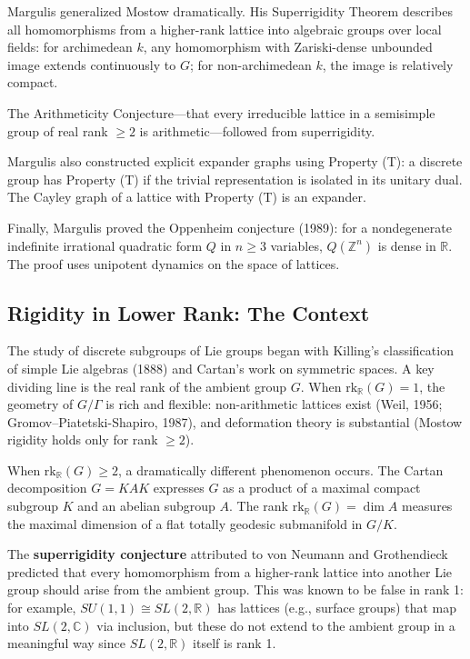 Margulis generalized Mostow dramatically. His Superrigidity Theorem
describes all homomorphisms from a higher-rank lattice into algebraic
groups over local fields: for archimedean $k$, any homomorphism with
Zariski-dense unbounded image extends continuously to $G$; for
non-archimedean $k$, the image is relatively compact.

The Arithmeticity Conjecture---that every irreducible lattice in a
semisimple group of real rank $\ge 2$ is arithmetic---followed from
superrigidity.

Margulis also constructed explicit expander graphs using Property (T):
a discrete group has Property (T) if the trivial representation is
isolated in its unitary dual. The Cayley graph of a lattice with
Property (T) is an expander.

Finally, Margulis proved the Oppenheim conjecture (1989): for a
nondegenerate indefinite irrational quadratic form $Q$ in $n \ge 3$
variables, $Q(\mathbb{Z}^n)$ is dense in $\mathbb{R}$. The proof uses
unipotent dynamics on the space of lattices.

\subsection{Rigidity in Lower Rank: The Context}

The study of discrete subgroups of Lie groups began with Killing's
classification of simple Lie algebras (1888) and Cartan's work on
symmetric spaces. A key dividing line is the real rank of the ambient
group $G$. When $\mathrm{rk}_{\mathbb{R}}(G) = 1$, the geometry of
$G/\Gamma$ is rich and flexible: non-arithmetic lattices exist
(Weil, 1956; Gromov--Piatetski-Shapiro, 1987), and deformation theory
is substantial (Mostow rigidity holds only for rank $\ge 2$).

When $\mathrm{rk}_{\mathbb{R}}(G) \ge 2$, a dramatically different
phenomenon occurs. The Cartan decomposition $G = KAK$ expresses $G$ as a
product of a maximal compact subgroup $K$ and an abelian subgroup $A$.
The rank $\mathrm{rk}_{\mathbb{R}}(G) = \dim A$ measures the maximal
dimension of a flat totally geodesic submanifold in $G/K$.

The \textbf{superrigidity conjecture} attributed to von Neumann and
Grothendieck predicted that every homomorphism from a higher-rank
lattice into another Lie group should arise from the ambient group.
This was known to be false in rank 1: for example, $SU(1,1) \cong
SL(2,\mathbb{R})$ has lattices (e.g., surface groups) that map into
$SL(2,\mathbb{C})$ via inclusion, but these do not extend to the ambient
group in a meaningful way since $SL(2,\mathbb{R})$ itself is rank 1.

